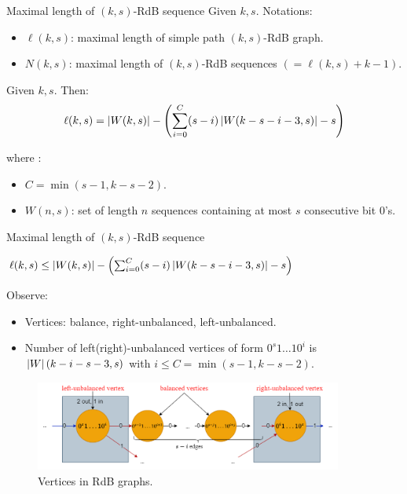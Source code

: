 \begin{frame}{Maximal length of $(k,s)$-RdB sequence}
    Given $k,s$. Notations:
    \begin{itemize}
        \item $\ell(k,s)$: maximal length of simple path $(k,s)$-RdB graph.
        \item $N(k,s)$: maximal length of $(k,s)$-RdB sequences $(=\ell(k,s)+k-1)$.
    \end{itemize}
    \begin{theorem}
        Given $k,s$. Then:
        \begin{align}
            \ell(k,s) = \left \lvert W(k,s) \right \rvert - \left(\sum_{i=0}^{C}(s-i)\left \lvert W(k-s-i-3,s) \right \rvert-s\right)
        \end{align}
    \end{theorem}
    where :
    \begin{itemize}
        \item $C=\min(s-1,k-s-2)$.
        \item $W(n,s)$: set of length $n$ sequences containing at most $s$ consecutive bit $0$'s. 
    \end{itemize}
\end{frame}

\begin{frame}{Maximal length of $(k,s)$-RdB sequence}
    \begin{lemma}
        \centering
        $\ell(k,s)\leq\left \lvert W(k,s) \right \rvert - \left(\sum_{i=0}^{C}(s-i)\left \lvert W(k-s-i-3,s) \right \rvert-s\right) $
    \end{lemma}
    Observe:
    \begin{itemize}
        \item Vertices: balance, right-unbalanced, left-unbalanced.
        \item Number of left(right)-unbalanced vertices of form $0^{s}1\ldots10^{i}$ is $\left \lvert W \right \rvert(k-i-s-3,s)$ with $i\leq C=\min(s-1,k-s-2)$.
    \end{itemize}
    \begin{figure}
        \centering
        \includegraphics[width=0.9\textwidth,height=.3\textheight]{Images/Rate/sketchproof.png}
        \caption{Vertices in RdB graphs.}
        \label{fig:sketchproof}
    \end{figure}
\end{frame}